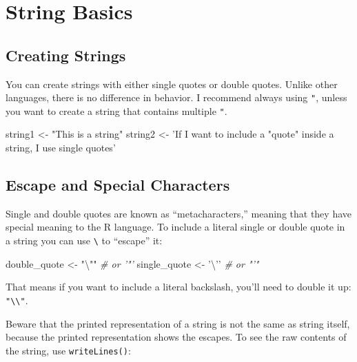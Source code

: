 \documentclass[]{book}
\newenvironment{Shaded}{\begin{snugshade}}{\end{snugshade}}
\newcommand{\CharTok}[1]{\textcolor[rgb]{0.31,0.60,0.02}{#1}}
\newcommand{\CommentTok}[1]{\textcolor[rgb]{0.56,0.35,0.01}{\textit{#1}}}
\newcommand{\NormalTok}[1]{#1}
\newcommand{\StringTok}[1]{\textcolor[rgb]{0.31,0.60,0.02}{#1}}
\begin{document}
\hypertarget{string-basics}{%
\section{String Basics}\label{string-basics}}

\hypertarget{creating-strings}{%
\subsection{Creating Strings}\label{creating-strings}}

You can create strings with either single quotes or double quotes. Unlike other languages, there is no difference in behavior. I recommend always using \texttt{"}, unless you want to create a string that contains multiple \texttt{"}.

\begin{Shaded}
\begin{Highlighting}[]
\NormalTok{string1 <-}\StringTok{ "This is a string"}
\NormalTok{string2 <-}\StringTok{ 'If I want to include a "quote" inside a string, I use single quotes'}
\end{Highlighting}
\end{Shaded}

\hypertarget{escape-and-special-characters}{%
\subsection{Escape and Special Characters}\label{escape-and-special-characters}}

Single and double quotes are known as ``metacharacters,'' meaning that they have special meaning to the R language. To include a literal single or double quote in a string you can use \texttt{\textbackslash{}} to ``escape'' it:

\begin{Shaded}
\begin{Highlighting}[]
\NormalTok{double_quote <-}\StringTok{ "}\CharTok{\textbackslash{}"}\StringTok{"} \CommentTok{# or '"'}
\NormalTok{single_quote <-}\StringTok{ '}\CharTok{\textbackslash{}'}\StringTok{'} \CommentTok{# or "'"}
\end{Highlighting}
\end{Shaded}

That means if you want to include a literal backslash, you'll need to double it up: \texttt{"\textbackslash{}\textbackslash{}"}.

Beware that the printed representation of a string is not the same as string itself, because the printed representation shows the escapes. To see the raw contents of the string, use \texttt{writeLines()}:
\end{document}
